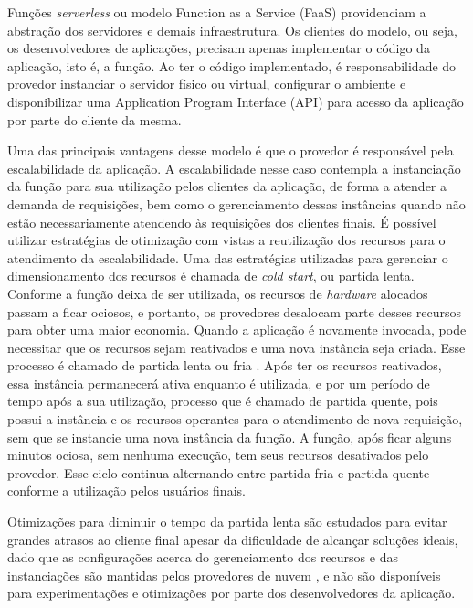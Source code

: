 \documentclass[conference]{IEEEtran}
\begin{document}
Funções \textit{serverless} ou modelo Function as a Service (FaaS) providenciam a abstração dos servidores e demais infraestrutura. Os clientes do modelo, ou seja, os desenvolvedores de aplicações, precisam apenas implementar o código da aplicação, isto é, a função. Ao ter o código implementado, é responsabilidade do provedor instanciar o servidor físico ou virtual, configurar o ambiente e disponibilizar uma Application Program Interface (API) para acesso da aplicação por parte do cliente da mesma. 

Uma das principais vantagens desse modelo é que o provedor é responsável pela escalabilidade da aplicação. A escalabilidade nesse caso contempla a instanciação da função para sua utilização pelos clientes da aplicação, de forma a atender a demanda de requisições, bem como o gerenciamento dessas instâncias quando não estão necessariamente atendendo às requisições dos clientes finais. É possível utilizar estratégias de otimização com vistas a reutilização dos recursos para o atendimento da escalabilidade.
Uma das estratégias utilizadas para gerenciar o dimensionamento dos recursos é chamada de \textit{cold start}, ou partida lenta. 
Conforme a função deixa de ser utilizada, os recursos de \textit{hardware} alocados passam a ficar ociosos, e portanto, os provedores desalocam parte desses recursos para obter uma maior economia. Quando a aplicação é novamente invocada, pode necessitar que os recursos sejam reativados e uma nova instância seja criada. Esse processo é chamado de partida lenta ou fria \cite{vahidinia_2020_cold_start}. Após ter os recursos reativados, essa instância permanecerá ativa enquanto é utilizada, e por um período de tempo após a sua utilização, processo que é chamado de partida quente, pois possui a instância e os recursos operantes \cite{Raje_2023_cold_warm_start} para o atendimento de nova requisição, sem que se instancie uma nova instância da função. A função, após ficar alguns minutos ociosa, sem nenhuma execução, tem seus recursos desativados pelo provedor. Esse ciclo continua alternando entre partida fria e partida quente conforme a utilização pelos usuários finais.

Otimizações para diminuir o tempo da partida lenta são estudados para evitar grandes atrasos ao cliente final apesar da dificuldade de alcançar soluções ideais, dado que as configurações acerca do gerenciamento dos recursos e das instanciações são mantidas pelos provedores de nuvem \cite{vahidinia_2020_cold_start, kumari_2022_mitigating_cold_start, vahidinia_2023_mitigating_cold_start, dantas_2022_reducing_cold_start}, e não são disponíveis para experimentações e otimizações por parte dos desenvolvedores da aplicação.
\end{document}

